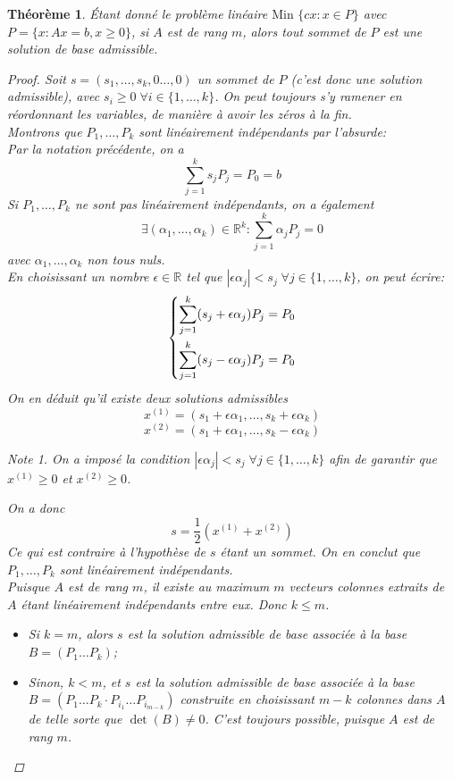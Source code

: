 \documentclass[a4paper]{report}
\theoremstyle{definition}
\theoremstyle{remark}
\newtheorem*{note}{Note}
\theoremstyle{plain}
\newtheorem{theorem}{Théorème}
\begin{document}
\begin{theorem}
Étant donné le problème linéaire \(\text{Min }\{cx:x\in P\}\) avec
\(P = \{x:Ax=b,x\ge 0\}\), si \(A\) est de rang \(m\), alors tout sommet de
\(P\) est une solution de base admissible.
\begin{proof}
Soit \(s=(s_1,\dots,s_k,0\dots,0)\) un sommet de \(P\) (c'est donc une solution
admissible), avec \(s_i\ge0\;\forall i\in\{1,\dots,k\}\). On peut toujours s'y ramener
en réordonnant les variables, de manière à avoir les zéros à la fin.\\
Montrons que \(P_1,\dots,P_k\) sont linéairement indépendants par l'absurde:\\
Par la notation précédente, on a
\[\sum_{j=1}^ks_jP_j=P_0=b\]
Si \(P_1,\dots,P_k\) ne sont pas linéairement indépendants, on a également
\[\exists (\alpha_1,\dots,\alpha_k)\in\mathbb{R}^k:\sum_{j=1}^k\alpha_jP_j=0\]
avec \(\alpha_1,\dots,\alpha_k\) non tous nuls.\\
En choisissant un nombre \(\epsilon\in\mathbb{R}\) tel que \(|\epsilon
\alpha_j|< s_j \;\forall j\in\{1,\dots,k\}\), on peut écrire:
\[\begin{dcases}
	\sum_{j=1}^k(s_j+\epsilon\alpha_j)P_j=P_0 \\
	\sum_{j=1}^k(s_j-\epsilon\alpha_j)P_j=P_0
\end{dcases}\]
On en déduit qu'il existe deux solutions admissibles
\[x^{(1)} = (s_1+\epsilon\alpha_1,\dots,s_k+\epsilon\alpha_k)\]
\[x^{(2)} = (s_1+\epsilon\alpha_1,\dots,s_k-\epsilon\alpha_k)\]
\begin{note}
On a imposé la condition \(|\epsilon \alpha_j|< s_j \;\forall j\in\{1,\dots,k\}\) afin
de garantir que \(x^{(1)}\ge0\) et \(x^{(2)}\ge0\).
\end{note}
On a donc
\[s=\frac{1}{2}(x^{(1)}+x^{(2)})\]
Ce qui est contraire à l'hypothèse de \(s\) étant un sommet. On en conclut que
\(P_1,\dots,P_k\) sont linéairement indépendants.\\
Puisque \(A\) est de rang \(m\), il existe au maximum \(m\) vecteurs colonnes
extraits de \(A\) étant linéairement indépendants entre eux. Donc \(k\le m\).
\begin{itemize}
	\item Si \(k=m\), alors \(s\) est la solution admissible de base associée à
	la base \(B=(P_1\dots P_k)\);
	\item Sinon, \(k<m\), et \(s\) est la solution admissible de base associée à
	la base \(B=(P_1\dots P_k\cdot P_{i_1}\dots P_{i_{m-k}})\)
	construite en choisissant \(m-k\) colonnes dans \(A\) de telle sorte que
	\(\det(B)\neq 0\). C'est toujours possible, puisque \(A\) est de rang \(m\).
\end{itemize}
\end{proof}
\end{theorem}
\end{document}
